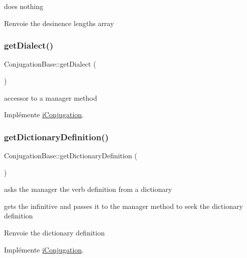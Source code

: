 does nothing

\begin{DoxyReturn}{Renvoie}
the desinence lengths array 
\end{DoxyReturn}
\hypertarget{classConjugationBase_a5010621a363fcfe26e5d23ade06d2c41}{}\label{classConjugationBase_a5010621a363fcfe26e5d23ade06d2c41} 
\subsubsection{\texorpdfstring{get\+Dialect()}{getDialect()}}
{\footnotesize\ttfamily Conjugation\+Base\+::get\+Dialect (\begin{DoxyParamCaption}{ }\end{DoxyParamCaption})}

accessor to a manager method 

Implémente \hyperlink{interfaceiConjugation_a4e0b6c0923ecd596b6acff6c7b776f5f}{i\+Conjugation}.

\hypertarget{classConjugationBase_aae493e154b07045a3ea072760ac44ef4}{}\label{classConjugationBase_aae493e154b07045a3ea072760ac44ef4} 
\subsubsection{\texorpdfstring{get\+Dictionary\+Definition()}{getDictionaryDefinition()}}
{\footnotesize\ttfamily Conjugation\+Base\+::get\+Dictionary\+Definition (\begin{DoxyParamCaption}{ }\end{DoxyParamCaption})}



asks the manager the verb definition from a dictionary 

gets the infinitive and passes it to the manager method to seek the dictionary definition

\begin{DoxyReturn}{Renvoie}
the dictionary definition 
\end{DoxyReturn}


Implémente \hyperlink{interfaceiConjugation_ab13cedc1b4f0d064a9bfff3cbfb63de6}{i\+Conjugation}.

\hypertarget{classConjugationBase_aa88c93007f333b916a6a51819e50e8ae}{}\label{classConjugationBase_aa88c93007f333b916a6a51819e50e8ae} 

